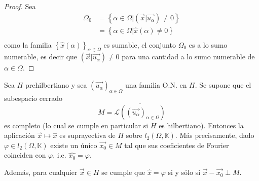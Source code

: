 \documentclass[12pt]{report}
\newcounter{it}
\theoremstyle{largebreak}
\newcommand\pint[2]{\ensuremath{\left(#1\big| #2\right)}}
\begin{document}
    \begin{proof}
        Sea
        \begin{equation*}
            \begin{split}
                \Omega_0
                &=\left\{\alpha\in\Omega\Big| \pint{\vec{x}}{\vec{u_\alpha}} \neq0 \right\}\\
                &=\left\{\alpha\in\Omega\Big| \hat{x}(\alpha)\neq0 \right\}\\
            \end{split}
        \end{equation*}
        como la familia $\left\{\hat{x}(\alpha) \right\}_{\alpha\in\Omega}$ es sumable, el conjunto $\Omega_0$ es a lo sumo numerable, es decir que $\pint{\vec{x}}{\vec{u_\alpha}}\neq0$ para una cantidad a lo sumo numerable de $\alpha\in\Omega$.
    \end{proof}

    \begin{theor}
        Sea $H$ prehilbertiano y sea $(\vec{u_\alpha})_{\alpha\in\Omega}$ una familia O.N. en $H$. Se supone que el subespacio cerrado
        \begin{equation*}
            M=\overline{\mathcal{L}((\vec{u_\alpha})_{\alpha\in\Omega})}
        \end{equation*}
        es completo (lo cual se cumple en particular si $H$ es hilbertiano). Entonces la aplicación $\vec{x}\mapsto\hat{x}$ es suprayectiva de $H$ sobre $l_2(\Omega,\mathbb{K})$. Más precisamente, dado $\varphi\in l_2(\Omega,\mathbb{K})$ existe un único $\vec{x_0}\in M$ tal que sus coeficientes de Fourier coinciden con $\varphi$, i.e. $\hat{x_0}=\varphi$.
        
        Además, para cualquier $\vec{x}\in H$ se cumple que $\hat{x}=\varphi$ si y sólo si $\vec{x}-\vec{x_0}\perp M$. 
    \end{theor}
\end{document}

